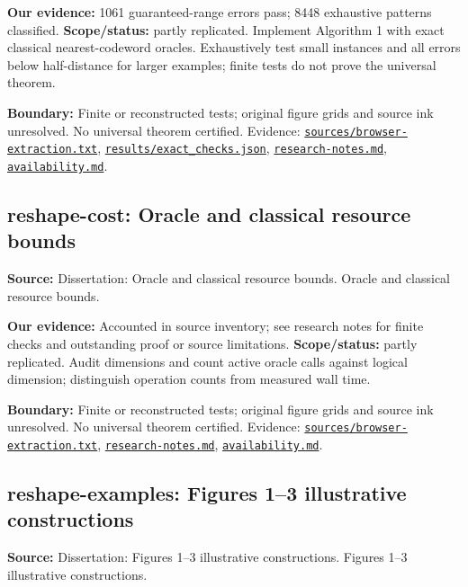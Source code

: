 \documentclass[11pt]{article}
\begin{document}
\textbf{Our evidence:} 1061 guaranteed-range errors pass; 8448 exhaustive patterns classified. \textbf{Scope/status:} partly replicated. Implement Algorithm 1 with exact classical nearest-codeword oracles. Exhaustively test small instances and all errors below half-distance for larger examples; finite tests do not prove the universal theorem.

\textbf{Boundary:} Finite or reconstructed tests; original figure grids and source ink unresolved. No universal theorem certified. Evidence: \href{https://github.com/alectionary/vibe-math/blob/master/formalization/quintavalle-hgp/sources/browser-extraction.txt}{\nolinkurl{sources/browser-extraction.txt}}, \href{https://github.com/alectionary/vibe-math/blob/master/formalization/quintavalle-hgp/results/exact_checks.json}{\nolinkurl{results/exact_checks.json}}, \href{https://github.com/alectionary/vibe-math/blob/master/formalization/quintavalle-hgp/research-notes.md}{\nolinkurl{research-notes.md}}, \href{https://github.com/alectionary/vibe-math/blob/master/formalization/quintavalle-hgp/availability.md}{\nolinkurl{availability.md}}.
\subsection{reshape-cost: Oracle and classical resource bounds}
\label{claim:reshape-cost}
\textbf{Source:} Dissertation: Oracle and classical resource bounds. Oracle and classical resource bounds.

\textbf{Our evidence:} Accounted in source inventory; see research notes for finite checks and outstanding proof or source limitations. \textbf{Scope/status:} partly replicated. Audit dimensions and count active oracle calls against logical dimension; distinguish operation counts from measured wall time.

\textbf{Boundary:} Finite or reconstructed tests; original figure grids and source ink unresolved. No universal theorem certified. Evidence: \href{https://github.com/alectionary/vibe-math/blob/master/formalization/quintavalle-hgp/sources/browser-extraction.txt}{\nolinkurl{sources/browser-extraction.txt}}, \href{https://github.com/alectionary/vibe-math/blob/master/formalization/quintavalle-hgp/research-notes.md}{\nolinkurl{research-notes.md}}, \href{https://github.com/alectionary/vibe-math/blob/master/formalization/quintavalle-hgp/availability.md}{\nolinkurl{availability.md}}.
\subsection{reshape-examples: Figures 1--3 illustrative constructions}
\label{claim:reshape-examples}
\textbf{Source:} Dissertation: Figures 1--3 illustrative constructions. Figures 1--3 illustrative constructions.
\end{document}
